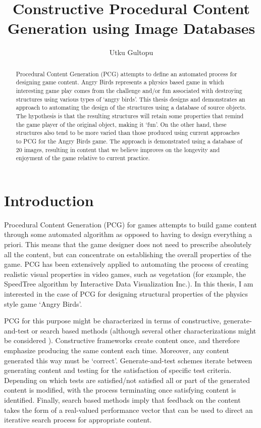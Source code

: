 \documentclass{dalthesis}
\begin{document}
\title{Constructive Procedural Content Generation using Image Databases}
\author{Utku Gultopu}
\mcs
\maketitle

\mainmatter
\begin{abstract}
Procedural Content Generation (PCG) attempts to define an automated process for designing game content. Angry Birds represents a physics based game in which interesting game play comes from the challenge and/or fun associated with destroying structures using various types of `angry birds'. This thesis designs and demonstrates an approach to automating the design of the structures using a database of source objects. The hypothesis is that the resulting structures will retain some properties that remind the game player of the original object, making it `fun'. On the other hand, these structures also tend to be more varied than those produced using current approaches to PCG for the Angry Birds game. The approach is demonstrated using a database of 20 images, resulting in content that we believe improves on the longevity and enjoyment of the game relative to current practice.
\end{abstract}
\chapter{Introduction}
Procedural Content Generation (PCG) for games attempts to build game content through some automated algorithm as opposed to having to design everything a priori. This means that the game designer does not need to prescribe absolutely all the content, but can concentrate on establishing the overall properties of the game. PCG has been extensively applied to automating the process of creating realistic visual properties in video games, such as vegetation (for example, the SpeedTree algorithm by Interactive Data Visualization Inc.). In this thesis, I am interested in the case of PCG for designing structural properties of the physics style game `Angry Birds'.

PCG for this purpose might be characterized in terms of constructive, generate-and-test or search based methods (although several other characterizations might be considered \cite{togelius11}). Constructive frameworks create content once, and therefore emphasize producing the same content each time. Moreover, any content generated this way must be `correct'. Generate-and-test schemes iterate between generating content and testing for the satisfaction of specific test criteria. Depending on which tests are satisfied/not satisfied all or part of the generated content is modified, with the process terminating once satisfying content is identified. Finally, search based methods imply that feedback on the content takes the form of a real-valued performance vector that can be used to direct an iterative search process for appropriate content.
\end{document}
